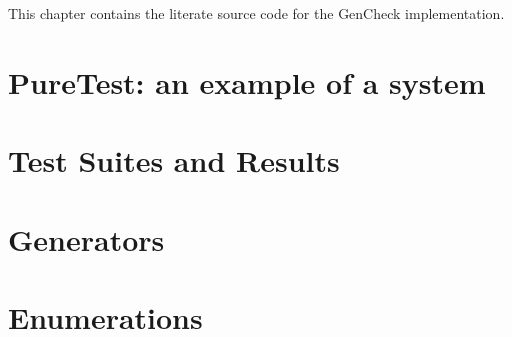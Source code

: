 
This chapter contains the literate source code for the GenCheck implementation.




\section{PureTest: an example of a \GC \pbt system}



\section{Test Suites and Results}






\section{Generators}


%

\section{Enumerations}



%
